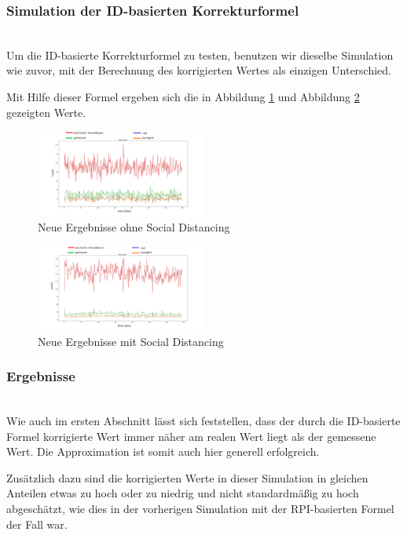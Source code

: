 \documentclass[conference,compsoc]{IEEEtran}
\begin{document}
\subsubsection{Simulation der ID-basierten Korrekturformel}
\text{}\\
Um die ID-basierte Korrekturformel zu testen, benutzen wir dieselbe Simulation wie zuvor, mit der Berechnung des korrigierten Wertes als einzigen Unterschied.

Mit Hilfe dieser Formel ergeben sich die in Abbildung \ref{mast_data_plotted} und Abbildung \ref{mast_data_plotted_social_distancing} gezeigten Werte.\\

\begin{figure}[h]
	\centering
	\includegraphics[width=0.5\textwidth]{"Mast_Data_Plotted"}
	\caption{Neue Ergebnisse ohne Social Distancing}
	\label{mast_data_plotted}
\end{figure}

\begin{figure}[h]
	\centering
	\includegraphics[width=0.5\textwidth]{"Mast_Data_Plotted_Social_Distancing"}
	\caption{Neue Ergebnisse mit Social Distancing}
	\label{mast_data_plotted_social_distancing}
\end{figure}

\subsubsection{Ergebnisse}
\text{}\\
Wie auch im ersten Abschnitt lässt sich feststellen, dass der durch die ID-basierte Formel korrigierte Wert immer näher am realen Wert liegt als der gemessene Wert. 
Die Approximation ist somit auch hier generell erfolgreich.

Zusätzlich dazu sind die korrigierten Werte in dieser Simulation in gleichen Anteilen etwas zu hoch oder zu niedrig und nicht standardmäßig zu hoch abgeschätzt,
wie dies in der vorherigen Simulation mit der RPI-basierten Formel der Fall war.
\end{document}
